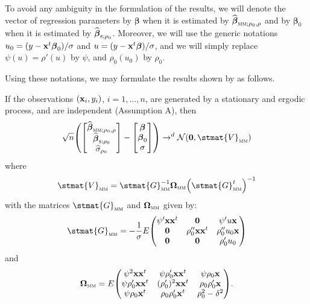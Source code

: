 To avoid any ambiguity in the formulation of the results, we will denote the
vector of regression parameters by $\boldsymbol\beta$ when it is estimated by
$\sthat{\boldsymbol\beta}_{\stsc{MM};\rho_0,\rho}$ and by $\boldsymbol\beta_0$
when it is estimated by $\sthat{\boldsymbol\beta}_{\stsc{S};\rho_0}$. Moreover,
we will use the generic notations $u_0 =
(y-\mathbf x^t\boldsymbol\beta_0)/\sigma$ and $u =
(y-\mathbf x^t\boldsymbol\beta)/\sigma$, and we will simply replace $\psi(u) =
\rho'(u)$ by $\psi$, and $\rho_0(u_0)$ by $\rho_0$.

Using these notations, we may formulate the results shown by \citet{Croux:2003}
as follows.

\begin{stproposition}
If the observations $(\mathbf x_i, y_i)$, $i = 1, \dots, n$, are generated 
by a stationary and ergodic process, and are independent (Assumption A), then
\[
    \sqrt{n} \left(
    \begin{bmatrix}
        \sthat{\boldsymbol\beta}_{\stsc{MM};\rho_0,\rho}\\
        \sthat{\boldsymbol\beta}_{\stsc{S};\rho_0}      \\
        \sthat{\sigma}_{\rho_0}
    \end{bmatrix}
    - 
    \begin{bmatrix}
        \boldsymbol\beta\\
        \boldsymbol\beta_0\\
        \sigma
    \end{bmatrix}
    \right) \rightarrow^d \mathcal{N}(\stvec{0},\stmat{V}_\stsc{MM})
\]
where
%
\begin{equation}\label{eq:V_MM}
    \stmat{V}_\stsc{MM} = \stmat{G}_\stsc{MM}^{-1}
    \boldsymbol\Omega_\stsc{MM} \left(\stmat{G}_\stsc{MM}^t\right)^{-1}
%
\end{equation}
%
with the matrices $\stmat{G}_\stsc{MM}$ and $\boldsymbol\Omega_\stsc{MM}$ given 
by:
%
\begin{equation}\label{eq:G_MM}
    \stmat{G}_\stsc{MM} = - \frac{1}{\sigma} 
    E\begin{pmatrix}
        \psi'\stvec{x}\stvec{x}^t & \stvec{0}                    & \psi'u\stvec{x}\\
        \stvec{0}                 & \rho_0''\stvec{x}\stvec{x}^t & \rho_0''u_0\stvec{x}\\
        \stvec{0}                 & \stvec{0}                    & \rho_0'u_0
    \end{pmatrix}
\end{equation}
%
and
%
\begin{equation}\label{eq:Omega_MM}
    \boldsymbol\Omega_\stsc{MM} = 
    E\begin{pmatrix}
        \psi^2\stvec{x}\stvec{x}^t      & \psi\rho_0'\stvec{x}\stvec{x}^t & \psi\rho_0\stvec{x} \\
        \psi\rho_0'\stvec{x}\stvec{x}^t & (\rho_0')^2\stvec{x}\stvec{x}^t & \rho_0\rho_0'\stvec{x}\\
        \psi\rho_0\stvec{x}^t           & \rho_0\rho_0'\stvec{x}^t        & \rho_0^2-\delta^2
    \end{pmatrix}.
\end{equation}
\end{stproposition}

